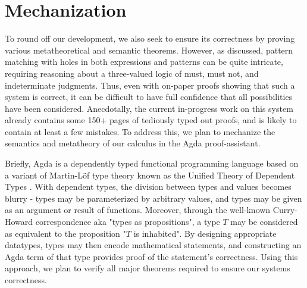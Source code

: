 \section{Mechanization}\label{sec:mechanization}
To round off our development, we also seek to ensure its correctness by proving various metatheoretical and semantic theorems. However, as discussed, pattern matching with holes in both expressions and patterns can be quite intricate, requiring reasoning about a three-valued logic of must, must not, and indeterminate judgments. Thus, even with on-paper proofs showing that such a system is correct, it can be difficult to have full confidence that all possibilities have been considered. Anecdotally, the current in-progress work on this system already contains some 150+ pages of tediously typed out proofs, and is likely to contain at least a few mistakes. To address this, we plan to mechanize the semantics and metatheory of our calculus in the Agda proof-assistant.

Briefly, Agda is a dependently typed functional programming language based on a variant of Martin-L\"of type theory known as the Unified Theory of Dependent Types \cite{DBLP:books/daglib/0078470, norell:thesis}. With dependent types, the division between types and values becomes blurry - types may be parameterized by arbitrary values, and types may be given as an argument or result of functions. Moreover, through the well-known Curry-Howard correspondence aka "types as propositions", a type $T$ may be considered as equivalent to the proposition "$T$ is inhabited". By designing appropriate datatypes, types may then encode mathematical statements, and constructing an Agda term of that type provides proof of the statement's correctness. Using this approach, we plan to verify all major theorems required to ensure our systems correctness.